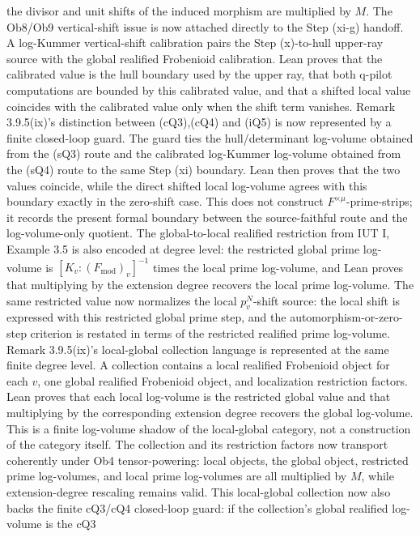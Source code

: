 \documentclass[11pt]{article}
\newcommand{\IUT}{IUT}
\newcommand{\Lean}{Lean}
\theoremstyle{plain}
\theoremstyle{definition}
\theoremstyle{remark}
\begin{document}
the divisor and unit shifts of the induced morphism are multiplied by \(M\).
The Ob8/Ob9 vertical-shift issue is now attached directly to the Step (xi-g)
handoff.  A log-Kummer vertical-shift calibration pairs the
Step (x)-to-hull upper-ray source with the global realified Frobenioid
calibration.  \Lean{} proves that the calibrated value is the hull boundary
used by the upper ray, that both q-pilot computations are bounded by this
calibrated value, and that a shifted local value coincides with the calibrated
value only when the shift term vanishes.
Remark 3.9.5(ix)'s distinction between (cQ3),(cQ4) and (iQ5) is now represented
by a finite closed-loop guard.  The guard ties the hull/determinant log-volume
obtained from the (sQ3) route and the calibrated log-Kummer log-volume obtained
from the (sQ4) route to the same Step (xi) boundary.  \Lean{} then proves that
the two values coincide, while the direct shifted local log-volume agrees with
this boundary exactly in the zero-shift case.  This does not construct
\(F^{\times\mu}\)-prime-strips; it records the present formal boundary between
the source-faithful route and the log-volume-only quotient.
The global-to-local realified restriction from \IUT{} I, Example 3.5 is also
encoded at degree level: the restricted global prime log-volume is
\([K_v:(F_{\mathrm{mod}})_v]^{-1}\) times the local prime log-volume, and
\Lean{} proves that multiplying by the extension degree recovers the local
prime log-volume.  The same restricted value now normalizes the local
\(p_v^N\)-shift source: the local shift is expressed with this restricted
global prime step, and the automorphism-or-zero-step criterion is restated in
terms of the restricted realified prime log-volume.
Remark 3.9.5(ix)'s local-global collection language is represented at the same
finite degree level.  A collection contains a local realified Frobenioid object
for each \(v\), one global realified Frobenioid object, and localization
restriction factors.  \Lean{} proves that each local log-volume is the
restricted global value and that multiplying by the corresponding extension
degree recovers the global log-volume.  This is a finite log-volume shadow of
the local-global category, not a construction of the category itself.  The
collection and its restriction factors now transport coherently under Ob4
tensor-powering: local objects, the global object, restricted prime log-volumes,
and local prime log-volumes are all multiplied by \(M\), while extension-degree
rescaling remains valid.
This local-global collection now also backs the finite cQ3/cQ4 closed-loop
guard: if the collection's global realified log-volume is the cQ3
\end{document}
